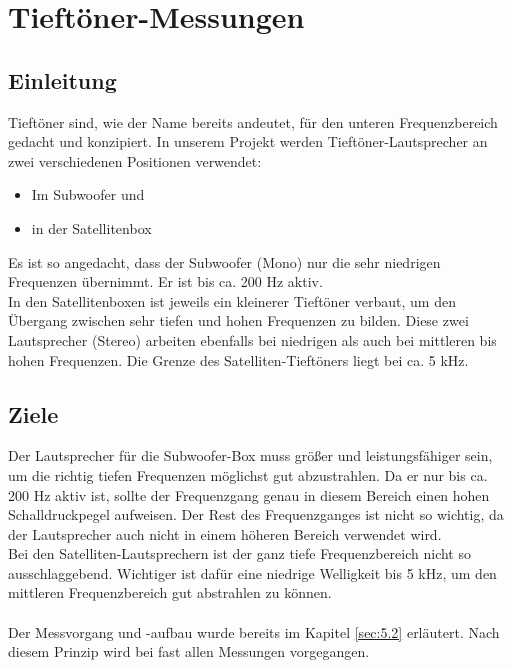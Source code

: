 \section{Tieftöner-Messungen} \label{sec:5.3}
\subsection{Einleitung} \label{subsec:5.3.1}
Tieftöner sind, wie der Name bereits andeutet, für den unteren Frequenzbereich gedacht und konzipiert. In unserem Projekt werden Tieftöner-Lautsprecher an zwei verschiedenen Positionen verwendet:
\begin{itemize}
	\item Im Subwoofer und 
	\item in der Satellitenbox
\end{itemize}
Es ist so angedacht, dass der Subwoofer (Mono) nur die sehr niedrigen Frequenzen übernimmt. Er ist bis ca. 200 Hz aktiv.\\
In den Satellitenboxen ist jeweils ein kleinerer Tieftöner verbaut, um den Übergang zwischen sehr tiefen und hohen Frequenzen zu bilden. Diese zwei Lautsprecher (Stereo) arbeiten ebenfalls bei niedrigen als auch bei mittleren bis hohen Frequenzen. Die Grenze des Satelliten-Tieftöners liegt bei ca. 5 kHz.

\subsection{Ziele} \label{subsec:5.3.2}
Der Lautsprecher für die Subwoofer-Box muss größer und leistungsfähiger sein, um die richtig tiefen Frequenzen möglichst gut abzustrahlen. Da er nur bis ca. 200 Hz aktiv ist, sollte der Frequenzgang genau in diesem Bereich einen hohen Schalldruckpegel aufweisen. Der Rest des Frequenzganges ist nicht so wichtig, da der Lautsprecher auch nicht in einem höheren Bereich verwendet wird. \\
Bei den Satelliten-Lautsprechern ist der ganz tiefe Frequenzbereich nicht so ausschlaggebend. Wichtiger ist dafür eine niedrige Welligkeit bis 5 kHz, um den mittleren Frequenzbereich gut abstrahlen zu können.\\ \\
Der Messvorgang und -aufbau wurde bereits im Kapitel \ref{sec:5.2} erläutert. Nach diesem Prinzip wird bei fast allen Messungen vorgegangen.

\newpage
